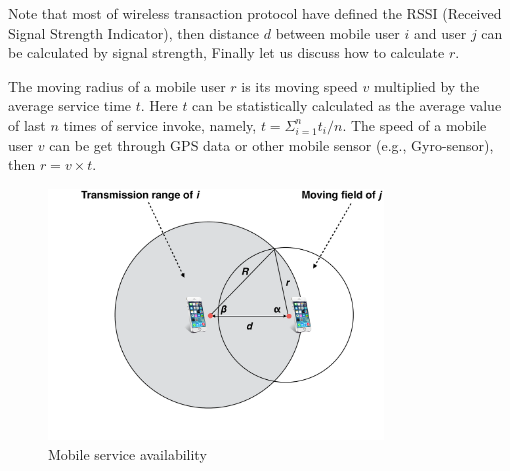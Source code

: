 \documentclass[10pt,journal,compsoc]{IEEEtran}
\begin{document}
Note that most of wireless transaction protocol have defined the RSSI (Received Signal Strength Indicator), then distance $d$ between mobile user $i$ and user $j$ can be calculated by signal strength, Finally let us discuss how to calculate $r$.


The moving radius of a mobile user $r$ is its moving speed $v$ multiplied by the average service time $t$. Here $t$ can be statistically calculated as the average value of last $n$ times of service invoke, namely, $t = \Sigma_{i=1}^{n}t_i/n$. The speed of a mobile user $v$ can be get through GPS data or other mobile sensor (e.g., Gyro-sensor), then $r = v \times t$.

\begin{figure}[!t]
\centering
\includegraphics[width=3.5in]{./img/pic3.pdf}
\caption{Mobile service availability}
\label{fig_sd}
\end{figure}
\end{document}
